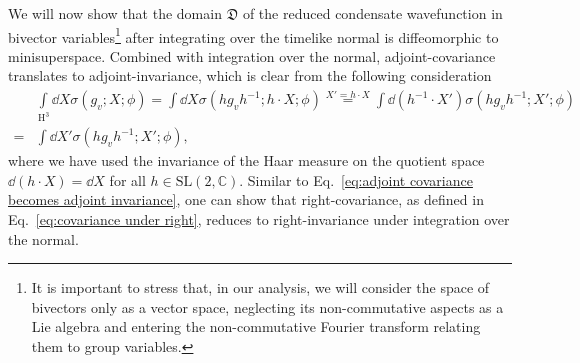 \documentclass[11pt,a4paper]{article}
\newcommand{\C}{\mathbb C}
\newcommand{\SL}{\text{SL$(2,\C)$}}
\newcommand{\HH}{\text{H}^3}
\begin{document}
We will now show that the domain $\mathfrak{D}$ of the reduced condensate wavefunction in bivector variables\footnote{It is important to stress that, in our analysis, we will consider the space of bivectors only as a vector space, neglecting its non-commutative aspects as a Lie algebra and entering the non-commutative Fourier transform relating them to group variables.} after integrating over the timelike normal is diffeomorphic to minisuperspace. Combined with integration over the normal, adjoint-covariance translates to adjoint-invariance, which is clear from the following consideration
%
\begin{equation}\label{eq:adjoint covariance becomes adjoint invariance}
\begin{aligned}
& \int\limits_{\HH}\dd{X}\sigma(g_v;X;\phi)
=
\int\dd{X}\sigma(hg_v h^{-1};h\cdot X;\phi)
\overset{X' = h\cdot X}{=}
\int\dd{\left(h^{-1}\cdot X'\right)}\sigma(hg_v h^{-1};X';\phi)\\[7pt]
=
& \int\dd{X'}\sigma(hg_v h^{-1};X';\phi),
\end{aligned}
\end{equation}
%
where we have used the invariance of the Haar measure on the quotient space $\dd{\left(h\cdot X\right)} = \dd{X}$ for all $h\in\SL$. Similar to Eq.~\eqref{eq:adjoint covariance becomes adjoint invariance}, one can show that right-covariance, as defined in Eq.~\eqref{eq:covariance under right}, reduces to right-invariance under integration over the normal.
\end{document}
